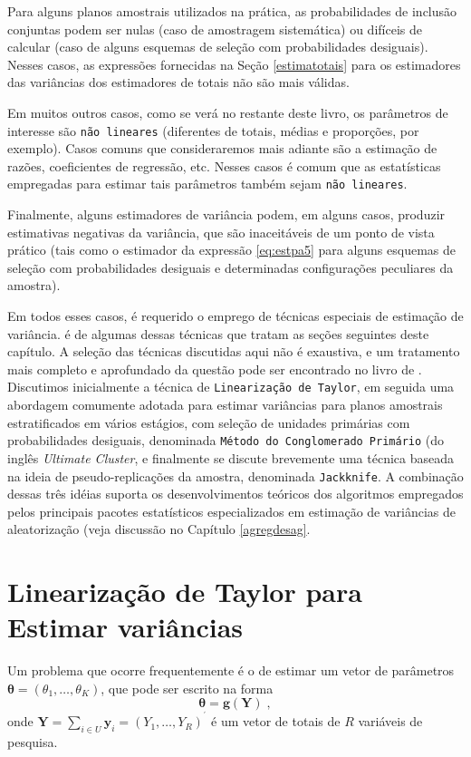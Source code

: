 \documentclass[]{book}
\numberwithin{example}{chapter}
\numberwithin{remark}{chapter}
\numberwithin{definition}{chapter}
\begin{document}
Para alguns planos amostrais utilizados na prática, as probabilidades de
inclusão conjuntas podem ser nulas (caso de amostragem sistemática) ou
difíceis de calcular (caso de alguns esquemas de seleção com
probabilidades desiguais). Nesses casos, as expressões fornecidas na
Seção \ref{estimatotais} para os estimadores das variâncias dos
estimadores de totais não são mais válidas.

Em muitos outros casos, como se verá no restante deste livro, os
parâmetros de interesse são \texttt{não\ lineares} (diferentes de
totais, médias e proporções, por exemplo). Casos comuns que
consideraremos mais adiante são a estimação de razões, coeficientes de
regressão, etc. Nesses casos é comum que as estatísticas empregadas para
estimar tais parâmetros também sejam \texttt{não\ lineares}.

Finalmente, alguns estimadores de variância podem, em alguns casos,
produzir estimativas negativas da variância, que são inaceitáveis de um
ponto de vista prático (tais como o estimador da expressão
\eqref{eq:estpa5} para alguns esquemas de seleção com probabilidades
desiguais e determinadas configurações peculiares da amostra).

Em todos esses casos, é requerido o emprego de técnicas especiais de
estimação de variância. é de algumas dessas técnicas que tratam as
seções seguintes deste capítulo. A seleção das técnicas discutidas aqui
não é exaustiva, e um tratamento mais completo e aprofundado da questão
pode ser encontrado no livro de \citep{W85}. Discutimos inicialmente a
técnica de \texttt{Linearização\ de\ Taylor}, em seguida uma abordagem
comumente adotada para estimar variâncias para planos amostrais
estratificados em vários estágios, com seleção de unidades primárias com
probabilidades desiguais, denominada
\texttt{Método\ do\ Conglomerado\ Primário} (do inglês \emph{Ultimate
Cluster}, e finalmente se discute brevemente uma técnica baseada na
ideia de pseudo-replicações da amostra, denominada \texttt{Jackknife}. A
combinação dessas três idéias suporta os desenvolvimentos teóricos dos
algoritmos empregados pelos principais pacotes estatísticos
especializados em estimação de variâncias de aleatorização (veja
discussão no Capítulo \ref{agregdesag}.

\section{Linearização de Taylor para Estimar variâncias}\label{taylor}

Um problema que ocorre frequentemente é o de estimar um vetor de
parâmetros
\(\mathbf{\theta =}\left( \theta _{1},\ldots ,\theta_{K}\right)\), que
pode ser escrito na forma \[
\mathbf{\theta }=\mathbf{g}(\mathbf{Y})\;, 
\] onde
\(\mathbf{Y}=\sum_{i\in U}\mathbf{y}_{i}=(Y_{1},\ldots ,Y_{R})^{^{\prime}}\)
é um vetor de totais de \(R\) variáveis de pesquisa.
\end{document}
